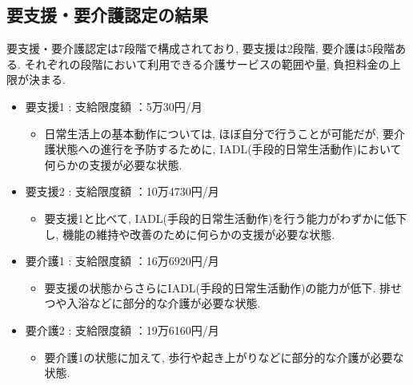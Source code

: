 \subsection{要支援・要介護認定の結果}
要支援・要介護認定は7段階で構成されており,  要支援は2段階, 要介護は5段階ある.
それぞれの段階において利用できる介護サービスの範囲や量, 負担料金の上限が決まる.

\begin{itemize} \setlength{\itemsep}{-0.5mm} \setlength{\parskip}{-0.5mm}
	\item 要支援1  :  支給限度額 ：5万30円/月
	      \begin{itemize} \setlength{\itemsep}{-0.5mm} \setlength{\parskip}{-0.5mm}
		      \item 日常生活上の基本動作については, ほぼ自分で行うことが可能だが, 要介護状態への進行を予防するために, IADL(手段的日常生活動作)において何らかの支援が必要な状態.
	      \end{itemize}

	\item 要支援2  :  支給限度額 ：10万4730円/月

	      \begin{itemize} \setlength{\itemsep}{-0.5mm} \setlength{\parskip}{-0.5mm}
		      \item 要支援1と比べて, IADL(手段的日常生活動作)を行う能力がわずかに低下し, 機能の維持や改善のために何らかの支援が必要な状態.

	      \end{itemize}

	\item 要介護1 : 支給限度額 ：16万6920円/月


	      \begin{itemize} \setlength{\itemsep}{-0.5mm} \setlength{\parskip}{-0.5mm}
		      \item 要支援の状態からさらにIADL(手段的日常生活動作)の能力が低下. 排せつや入浴などに部分的な介護が必要な状態.

	      \end{itemize}

	\item 要介護2 : 支給限度額 ：19万6160円/月


	      \begin{itemize} \setlength{\itemsep}{-0.5mm} \setlength{\parskip}{-0.5mm}
		      \item 要介護1の状態に加えて, 歩行や起き上がりなどに部分的な介護が必要な状態.

	      \end{itemize}


\end{itemize}
